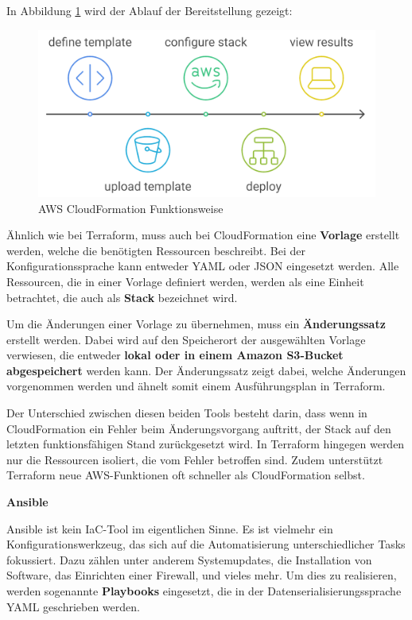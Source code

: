     In Abbildung \ref{fig:aws-cloudformation} wird der Ablauf der Bereitstellung gezeigt:

    \begin{figure}[H]
        \centering
        \includegraphics[width=0.7\linewidth]{images/EA/cloudformation-workflow.png}
        \caption{AWS CloudFormation Funktionsweise}
        \label{fig:aws-cloudformation}
    \end{figure}

    Ähnlich wie bei Terraform, muss auch bei CloudFormation eine \textbf{Vorlage} erstellt werden, welche die benötigten Ressourcen beschreibt.
    Bei der Konfigurationssprache kann entweder YAML oder JSON eingesetzt werden. Alle Ressourcen, die in einer Vorlage definiert werden, werden als eine Einheit betrachtet, die auch als \textbf{Stack} bezeichnet wird.

    Um die Änderungen einer Vorlage zu übernehmen, muss ein \textbf{Änderungssatz} erstellt werden. Dabei wird auf den Speicherort der ausgewählten Vorlage verwiesen, die entweder \textbf{lokal oder in einem Amazon S3-Bucket abgespeichert} werden kann. 
    Der Änderungssatz zeigt dabei, welche Änderungen vorgenommen werden und ähnelt somit einem Ausführungsplan in Terraform. 
    \cite{EA:Web50, EA:Web51}
    
    Der Unterschied zwischen diesen beiden Tools besteht darin, dass wenn in CloudFormation ein Fehler beim Änderungsvorgang auftritt, der Stack auf den letzten funktionsfähigen Stand zurückgesetzt wird. In Terraform hingegen werden nur die Ressourcen isoliert, die vom Fehler betroffen sind. Zudem unterstützt Terraform neue AWS-Funktionen oft schneller als CloudFormation selbst. 
    \cite{EA:Web52}

    \clearpage



    \textbf{Ansible}    

    Ansible ist kein IaC-Tool im eigentlichen Sinne. Es ist vielmehr ein Konfigurationswerkzeug, das sich auf die Automatisierung unterschiedlicher Tasks fokussiert. Dazu zählen unter anderem Systemupdates, die Installation von Software, das Einrichten einer Firewall, und vieles mehr. Um dies zu realisieren, werden sogenannte \textbf{Playbooks} eingesetzt, die in der Datenserialisierungssprache YAML geschrieben werden.

